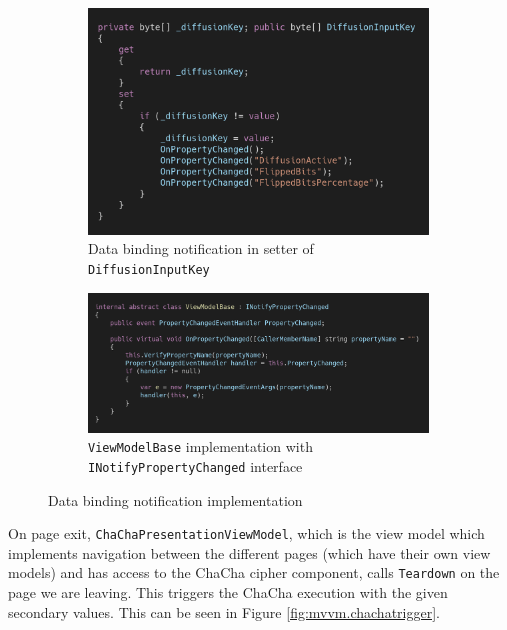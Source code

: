 \begin{figure}
\centering
\begin{subfigure}[t]{0.5\textwidth}
\centering
\includegraphics[width=0.99\textwidth]{figures/code/mvvm-arch/onpropertychanged.png}
\caption{Data binding notification in setter of \texttt{DiffusionInputKey}}
\label{fig:mvvm.onpropertychanged}
\end{subfigure}%
\begin{subfigure}[t]{0.5\textwidth}
\centering
\includegraphics[width=0.99\textwidth]{figures/code/mvvm-arch/viewmodelbase.png}
\caption{\texttt{ViewModelBase} implementation with \texttt{INotifyPropertyChanged} interface}
\label{fig:mvvm.viewmodelbase}
\end{subfigure}
\caption{Data binding notification implementation}
\label{fig:mvvm.databindingnotification}
\end{figure}

On page exit, \texttt{ChaChaPresentationViewModel}, which is the view model which implements navigation between the different pages (which have their own view models) and has access to the ChaCha cipher component, calls \texttt{Teardown} on the page we are leaving. This triggers the ChaCha execution with the given secondary values. This can be seen in Figure \ref{fig:mvvm.chachatrigger}.

